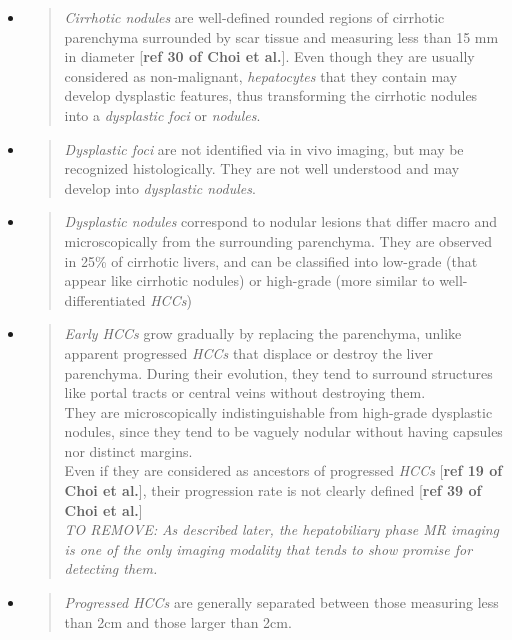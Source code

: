 \documentclass[]{article}
\begin{document}
\begin{itemize}
\item
  \begin{quote}
  \emph{Cirrhotic nodules} are well-defined rounded regions of cirrhotic
  parenchyma surrounded by scar tissue and measuring less than 15 mm in
  diameter {[}\textbf{ref 30 of Choi et al.}{]}. Even though they are
  usually considered as non-malignant, \emph{hepatocytes} that they
  contain may develop dysplastic features, thus transforming the
  cirrhotic nodules into a \emph{dysplastic foci} or \emph{nodules}.
  \end{quote}
\item
  \begin{quote}
  \emph{Dysplastic foci} are not identified via in vivo imaging, but may
  be recognized histologically. They are not well understood and may
  develop into \emph{dysplastic nodules}.
  \end{quote}
\item
  \begin{quote}
  \emph{Dysplastic nodules} correspond to nodular lesions that differ
  macro and microscopically from the surrounding parenchyma. They are
  observed in 25\% of cirrhotic livers, and can be classified into
  low-grade (that appear like cirrhotic nodules) or high-grade (more
  similar to well-differentiated \emph{HCCs})
  \end{quote}
\item
  \begin{quote}
  \emph{Early HCCs} grow gradually by replacing the parenchyma, unlike
  apparent progressed \emph{HCCs} that displace or destroy the liver
  parenchyma. During their evolution, they tend to surround structures
  like portal tracts or central veins without destroying them.\\
  They are microscopically indistinguishable from high-grade dysplastic
  nodules, since they tend to be vaguely nodular without having capsules
  nor distinct margins.\\
  Even if they are considered as ancestors of progressed \emph{HCCs}
  {[}\textbf{ref 19 of Choi et al.}{]}, their progression rate is not
  clearly defined {[}\textbf{ref 39 of Choi et al.}{]}\\
  \emph{TO REMOVE:} \emph{As described later, the hepatobiliary phase MR
  imaging is one of the only imaging modality that tends to show promise
  for detecting them.}
  \end{quote}
\item
  \begin{quote}
  \emph{Progressed HCCs} are generally separated between those measuring
  less than 2cm and those larger than 2cm.
  \end{quote}


\end{itemize}
\end{document}
